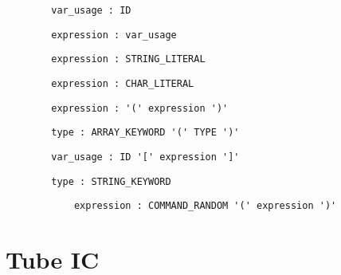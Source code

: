 \documentclass[10pt,landscape]{article}
\begin{document}
\begin{multicols}{3}
		\begin{verbatim}
		var_usage : ID
		\end{verbatim}
		\begin{verbatim}
		expression : var_usage
		\end{verbatim}
		\begin{verbatim}
		expression : STRING_LITERAL
		\end{verbatim}
		\begin{verbatim}
		expression : CHAR_LITERAL
		\end{verbatim}
		\begin{verbatim}
		expression : '(' expression ')'
		\end{verbatim}
		\begin{verbatim}
		type : ARRAY_KEYWORD '(' TYPE ')'
		\end{verbatim}
		\begin{verbatim}
		var_usage : ID '[' expression ']'
		\end{verbatim}
		\begin{verbatim}
		type : STRING_KEYWORD
		\end{verbatim}
		\begin{verbatim}
			expression : COMMAND_RANDOM '(' expression ')'
		\end{verbatim}
		
        \section{Tube IC}

\end{multicols}
\end{document}
